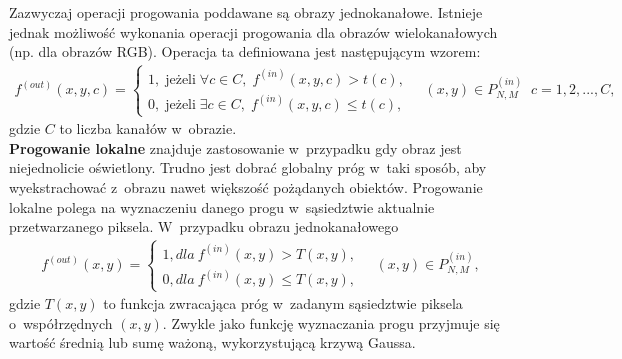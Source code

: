 Zazwyczaj operacji progowania poddawane są obrazy jednokanałowe. Istnieje jednak możliwość wykonania operacji progowania dla obrazów wielokanałowych (np. dla obrazów RGB). Operacja ta definiowana jest następującym wzorem:
\begin{gather*}
  f^{(out)}(x, y, c) = \left\{\begin{matrix}
  1, \; \text{jeżeli} \; \forall c \in C, \; f^{(in)}(x, y, c) > t(c),\\
  0, \; \text{jeżeli} \; \exists c \in C, \; f^{(in)}(x, y, c) \leq t(c),
  \end{matrix}\right. \quad (x, y) \in P^{(in)}_{N,M} \;\; c=1,2,...,C,
\end{gather*}
gdzie $C$ to liczba kanałów w~obrazie. \\

\textbf{Progowanie lokalne} znajduje zastosowanie w~przypadku gdy obraz jest niejednolicie oświetlony. Trudno jest dobrać globalny próg w~taki sposób, aby wyekstrachować z~obrazu nawet większość pożądanych obiektów. Progowanie lokalne polega na wyznaczeniu danego progu w~sąsiedztwie aktualnie przetwarzanego piksela. W~przypadku obrazu jednokanałowego
\begin{gather*}
  f^{(out)}(x, y) = \left\{\begin{matrix}
  1, dla \: f^{(in)}(x, y) > T(x, y),\\
  0, dla \: f^{(in)}(x, y) \leq T(x, y),
  \end{matrix}\right. \quad (x, y) \in P^{(in)}_{N,M},
\end{gather*}
gdzie $T(x, y)$ to funkcja zwracająca próg w~zadanym sąsiedztwie piksela o~współrzędnych $(x, y)$. Zwykle jako funkcję wyznaczania progu przyjmuje się wartość średnią lub sumę ważoną, wykorzystującą krzywą Gaussa.

